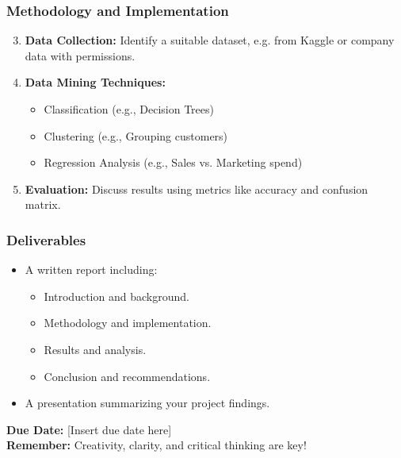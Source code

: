\documentclass[aspectratio=169]{beamer}
\begin{document}
\begin{frame}[fragile]
    \frametitle{Methodology and Implementation}
    \begin{enumerate}
        \setcounter{enumi}{2}
        \item \textbf{Data Collection:}
        Identify a suitable dataset, e.g. from Kaggle or company data with permissions.

        \item \textbf{Data Mining Techniques:}
        \begin{itemize}
            \item Classification (e.g., Decision Trees)
            \item Clustering (e.g., Grouping customers)
            \item Regression Analysis (e.g., Sales vs. Marketing spend)
        \end{itemize}
        
        \item \textbf{Evaluation:} Discuss results using metrics like accuracy and confusion matrix.
    \end{enumerate}
\end{frame}

\begin{frame}[fragile]
    \frametitle{Deliverables}
    \begin{itemize}
        \item A written report including:
        \begin{itemize}
            \item Introduction and background.
            \item Methodology and implementation.
            \item Results and analysis.
            \item Conclusion and recommendations.
        \end{itemize}
        \item A presentation summarizing your project findings.
    \end{itemize}
    \textbf{Due Date:} [Insert due date here] \\
    \textbf{Remember:} Creativity, clarity, and critical thinking are key! 
\end{frame}
\end{document}
